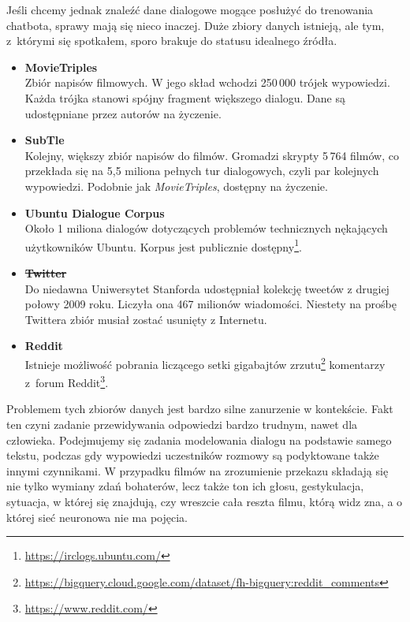 Jeśli chcemy jednak znaleźć dane dialogowe mogące posłużyć do trenowania chatbota, sprawy mają się nieco inaczej. Duże zbiory danych istnieją, ale tym, z~którymi się spotkałem, sporo brakuje do statusu idealnego źródła.

\begin{itemize}
    \item \textbf{MovieTriples} \cite{serbanhred}\\[3pt]
    Zbiór napisów filmowych. W jego skład wchodzi 250\,000 trójek wypowiedzi. Każda trójka stanowi spójny fragment większego dialogu. Dane są udostępniane przez autorów na życzenie.

    \item \textbf{SubTle} \cite{subtle}\\[3pt]
    Kolejny, większy zbiór napisów do filmów. Gromadzi skrypty 5\,764 filmów, co przekłada się na 5,5 miliona pełnych tur dialogowych, czyli par kolejnych wypowiedzi. Podobnie jak \textit{MovieTriples}, dostępny na życzenie.

    \item \textbf{Ubuntu Dialogue Corpus} \cite{ubuntu}\\[3pt]
    Około 1 miliona dialogów dotyczących problemów technicznych nękających użytkowników Ubuntu. Korpus jest publicznie dostępny\footnote{\url{https://irclogs.ubuntu.com/}}.

    \item \textbf{\st{Twitter}} \cite{snapdata}\\[3pt]
    Do niedawna Uniwersytet Stanforda udostępniał kolekcję tweetów z drugiej połowy 2009 roku. Liczyła ona 467 milionów wiadomości. Niestety na prośbę Twittera zbiór musiał zostać usunięty z Internetu.

    \item \textbf{Reddit}\\[3pt]
    Istnieje możliwość pobrania liczącego setki gigabajtów zrzutu\footnote{\url{https://bigquery.cloud.google.com/dataset/fh-bigquery:reddit_comments}} komentarzy z~forum Reddit\footnote{\url{https://www.reddit.com/}}.
\end{itemize}

Problemem tych zbiorów danych jest bardzo silne zanurzenie w kontekście. Fakt ten czyni zadanie przewidywania odpowiedzi bardzo trudnym, nawet dla człowieka. Podejmujemy się zadania modelowania dialogu na podstawie samego tekstu, podczas gdy wypowiedzi uczestników rozmowy są podyktowane także innymi czynnikami. W przypadku filmów na zrozumienie przekazu składają się nie tylko wymiany zdań bohaterów, lecz także ton ich głosu, gestykulacja, sytuacja, w której się znajdują, czy wreszcie cała reszta filmu, którą widz zna, a o której sieć neuronowa nie ma pojęcia.

